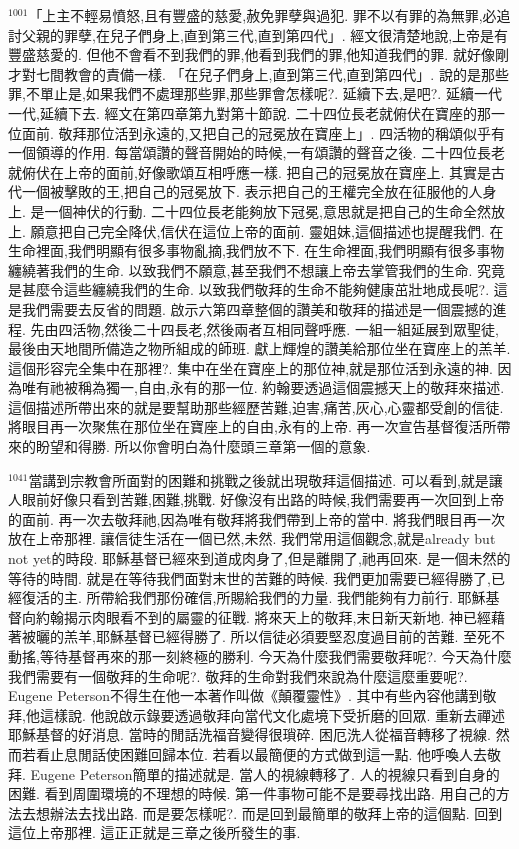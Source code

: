 \documentclass{book}
\begin{document}
$^{1001}$「上主不輕易憤怒,且有豐盛的慈愛,赦免罪孽與過犯.
罪不以有罪的為無罪,必追討父親的罪孽,在兒子們身上,直到第三代,直到第四代」.
經文很清楚地說,上帝是有豐盛慈愛的.
但他不會看不到我們的罪,他看到我們的罪,他知道我們的罪.
就好像剛才對七間教會的責備一樣.
「在兒子們身上,直到第三代,直到第四代」.
說的是那些罪,不單止是,如果我們不處理那些罪,那些罪會怎樣呢?.
延續下去,是吧?.
延續一代一代,延續下去.
經文在第四章第九對第十節說.
二十四位長老就俯伏在寶座的那一位面前.
敬拜那位活到永遠的,又把自己的冠冕放在寶座上」.
四活物的稱頌似乎有一個領導的作用.
每當頌讚的聲音開始的時候,一有頌讚的聲音之後.
二十四位長老就俯伏在上帝的面前,好像歌頌互相呼應一樣.
把自己的冠冕放在寶座上.
其實是古代一個被擊敗的王,把自己的冠冕放下.
表示把自己的王權完全放在征服他的人身上.
是一個神伏的行動.
二十四位長老能夠放下冠冕,意思就是把自己的生命全然放上.
願意把自己完全降伏,信伏在這位上帝的面前.
靈姐妹,這個描述也提醒我們.
在生命裡面,我們明顯有很多事物亂摘,我們放不下.
在生命裡面,我們明顯有很多事物纏繞著我們的生命.
以致我們不願意,甚至我們不想讓上帝去掌管我們的生命.
究竟是甚麼令這些纏繞我們的生命.
以致我們敬拜的生命不能夠健康茁壯地成長呢?.
這是我們需要去反省的問題.
啟示六第四章整個的讚美和敬拜的描述是一個震撼的進程.
先由四活物,然後二十四長老,然後兩者互相同聲呼應.
一組一組延展到眾聖徒,最後由天地間所備造之物所組成的師班.
獻上輝煌的讚美給那位坐在寶座上的羔羊.
這個形容完全集中在那裡?.
集中在坐在寶座上的那位神,就是那位活到永遠的神.
因為唯有祂被稱為獨一,自由,永有的那一位.
約翰要透過這個震撼天上的敬拜來描述.
這個描述所帶出來的就是要幫助那些經歷苦難,迫害,痛苦,灰心,心靈都受創的信徒.
將眼目再一次聚焦在那位坐在寶座上的自由,永有的上帝.
再一次宣告基督復活所帶來的盼望和得勝.
所以你會明白為什麼頭三章第一個的意象.

$^{1041}$當講到宗教會所面對的困難和挑戰之後就出現敬拜這個描述.
可以看到,就是讓人眼前好像只看到苦難,困難,挑戰.
好像沒有出路的時候,我們需要再一次回到上帝的面前.
再一次去敬拜祂,因為唯有敬拜將我們帶到上帝的當中.
將我們眼目再一次放在上帝那裡.
讓信徒生活在一個已然,未然.
我們常用這個觀念,就是already but not yet的時段.
耶穌基督已經來到道成肉身了,但是離開了,祂再回來.
是一個未然的等待的時間.
就是在等待我們面對末世的苦難的時候.
我們更加需要已經得勝了,已經復活的主.
所帶給我們那份確信,所賜給我們的力量.
我們能夠有力前行.
耶穌基督向約翰揭示肉眼看不到的屬靈的征戰.
將來天上的敬拜,末日新天新地.
神已經藉著被曬的羔羊,耶穌基督已經得勝了.
所以信徒必須要堅忍度過目前的苦難.
至死不動搖,等待基督再來的那一刻終極的勝利.
今天為什麼我們需要敬拜呢?.
今天為什麼我們需要有一個敬拜的生命呢?.
敬拜的生命對我們來說為什麼這麼重要呢?.
Eugene Peterson不得生在他一本著作叫做《顛覆靈性》.
其中有些內容他講到敬拜,他這樣說.
他說啟示錄要透過敬拜向當代文化處境下受折磨的回眾.
重新去禪述耶穌基督的好消息.
當時的閒話洗福音變得很瑣碎.
困厄洗人從福音轉移了視線.
然而若看止息閒話使困難回歸本位.
若看以最簡便的方式做到這一點.
他呼喚人去敬拜.
Eugene Peterson簡單的描述就是.
當人的視線轉移了.
人的視線只看到自身的困難.
看到周圍環境的不理想的時候.
第一件事物可能不是要尋找出路.
用自己的方法去想辦法去找出路.
而是要怎樣呢?.
而是回到最簡單的敬拜上帝的這個點.
回到這位上帝那裡.
這正正就是三章之後所發生的事.
\end{document}
